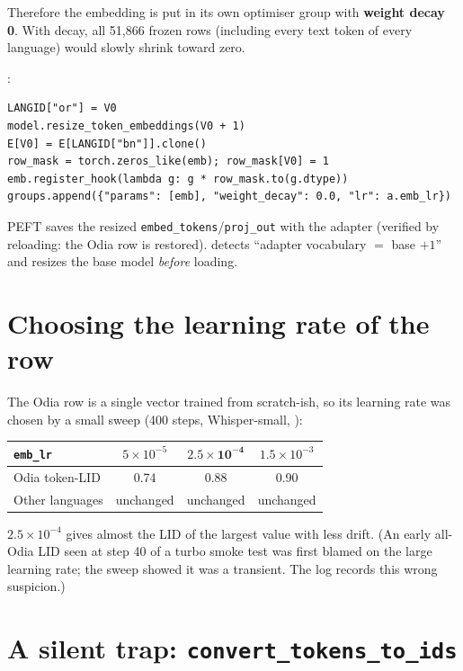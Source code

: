 Therefore the embedding is put in its own optimiser group with \textbf{weight decay 0}. With decay, all 51{,}866 frozen rows
(including every text token of every language) would slowly shrink toward zero.

\begin{incode}
:
\begin{lstlisting}
LANGID["or"] = V0
model.resize_token_embeddings(V0 + 1)
E[V0] = E[LANGID["bn"]].clone()
row_mask = torch.zeros_like(emb); row_mask[V0] = 1
emb.register_hook(lambda g: g * row_mask.to(g.dtype))
groups.append({"params": [emb], "weight_decay": 0.0, "lr": a.emb_lr})
\end{lstlisting}
PEFT saves the resized \texttt{embed\_tokens}/\texttt{proj\_out} with the adapter (verified by reloading: the Odia row is
restored).  detects ``adapter vocabulary $=$ base $+1$'' and resizes the base model \emph{before} loading.
\end{incode}

\section{Choosing the learning rate of the row}

The Odia row is a single vector trained from scratch-ish, so its learning rate was chosen by a small sweep (400 steps,
Whisper-small, ):

\begin{center}
\begin{tabular}{lccc}
\toprule
\texttt{emb\_lr} & $5\times10^{-5}$ & $\mathbf{2.5\times10^{-4}}$ & $1.5\times10^{-3}$\\
\midrule
Odia token-LID & 0.74 & 0.88 & 0.90\\
Other languages & unchanged & unchanged & unchanged\\
\bottomrule
\end{tabular}
\end{center}
$2.5\times10^{-4}$ gives almost the LID of the largest value with less drift. (An early all-Odia LID seen at step 40 of a turbo smoke
test was first blamed on the large learning rate; the sweep showed it was a transient. The log records this wrong suspicion.)

\section{A silent trap: \texttt{convert\_tokens\_to\_ids}}

